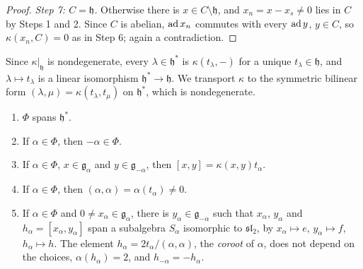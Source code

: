 \begin{proof}
\emph{Step 7: $C = \mathfrak{h}$.} Otherwise there is $x \in C \setminus \mathfrak{h}$, and $x_n = x - x_s \neq 0$ lies in $C$ by Steps 1 and 2. Since $C$ is abelian, $\operatorname{ad} x_n$
commutes with every $\operatorname{ad} y$, $y \in C$, so $\kappa(x_n, C) = 0$ as in Step 6; again a contradiction.
\end{proof}

Since $\kappa|_{\mathfrak{h}}$ is nondegenerate, every $\lambda \in \mathfrak{h}^*$ is $\kappa(t_\lambda, -)$ for a unique $t_\lambda \in \mathfrak{h}$, and $\lambda \mapsto t_\lambda$ is a
linear isomorphism $\mathfrak{h}^* \to \mathfrak{h}$. We transport $\kappa$ to the symmetric bilinear form $(\lambda, \mu) = \kappa(t_\lambda, t_\mu)$ on $\mathfrak{h}^*$, which is
nondegenerate.

\begin{proposition}\label{representation-theory:proposition-roots-sl2}
\begin{enumerate}
\item $\Phi$ spans $\mathfrak{h}^*$.
\item If $\alpha \in \Phi$, then $-\alpha \in \Phi$.
\item If $\alpha \in \Phi$, $x \in \mathfrak{g}_\alpha$ and $y \in \mathfrak{g}_{-\alpha}$, then $[x, y] = \kappa(x, y)t_\alpha$.
\item If $\alpha \in \Phi$, then $(\alpha, \alpha) = \alpha(t_\alpha) \neq 0$.
\item If $\alpha \in \Phi$ and $0 \neq x_\alpha \in \mathfrak{g}_\alpha$, there is $y_\alpha \in \mathfrak{g}_{-\alpha}$ such that $x_\alpha$, $y_\alpha$ and
$h_\alpha = [x_\alpha, y_\alpha]$ span a subalgebra $S_\alpha$ isomorphic to $\mathfrak{sl}_2$, by $x_\alpha \mapsto e$, $y_\alpha \mapsto f$, $h_\alpha \mapsto h$. The element
$h_\alpha = 2t_\alpha/(\alpha, \alpha)$, the \emph{coroot} of $\alpha$, does not depend on the choices, $\alpha(h_\alpha) = 2$, and $h_{-\alpha} = -h_\alpha$.
\end{enumerate}
\end{proposition}

